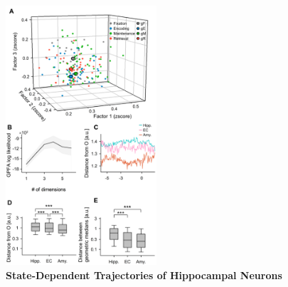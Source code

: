 \documentclass[final,3p,times,twocolumn]{elsarticle}
\begin{document}
        \clearpage
        \begin{figure}[ht]
        	\centering
            \includegraphics[width=0.5\textwidth]{./src/figures/.png/Figure_ID_02.png}
        	\caption{\textbf{
State-Dependent Trajectories of Hippocampal Neurons
}
\smallskip
\\
}
\end{figure}
\end{document}
